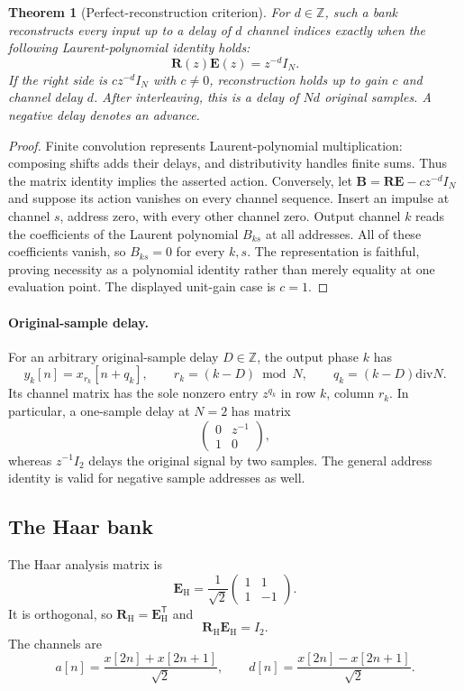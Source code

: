 \documentclass[11pt,a4paper]{article}
\newtheorem{theorem}{Theorem}[section]
\theoremstyle{definition}
\theoremstyle{remark}
\newcommand{\bbZ}{\mathbb Z}
\begin{document}
\begin{theorem}[Perfect-reconstruction criterion]\label{result:06}
For $d\in\bbZ$, such a bank reconstructs every input up to a delay of $d$ \emph{channel indices} exactly when the following Laurent-polynomial identity holds:
\[
\boxed{
\bm R(z)\bm E(z)=z^{-d}I_N.
}
\]
If the right side is $c z^{-d}I_N$ with $c\ne0$, reconstruction holds up to gain $c$ and channel delay $d$. After interleaving, this is a delay of $Nd$ original samples. A negative delay denotes an advance.
\end{theorem}

\begin{proof}
Finite convolution represents Laurent-polynomial multiplication: composing shifts adds their delays, and distributivity handles finite sums. Thus the matrix identity implies the asserted action. Conversely, let $\bm B=\bm R\bm E-cz^{-d}I_N$ and suppose its action vanishes on every channel sequence. Insert an impulse at channel $s$, address zero, with every other channel zero. Output channel $k$ reads the coefficients of the Laurent polynomial $B_{ks}$ at all addresses. All of these coefficients vanish, so $B_{ks}=0$ for every $k,s$. The representation is faithful, proving necessity as a polynomial identity rather than merely equality at one evaluation point. The displayed unit-gain case is $c=1$.
\end{proof}

\paragraph{Original-sample delay.}
For an arbitrary original-sample delay $D\in\bbZ$, the output phase $k$ has
\[
y_k[n]=x_{r_k}[n+q_k],\qquad
r_k=(k-D)\bmod N,\qquad q_k=(k-D)\mathbin{\mathrm{div}}N.
\]
Its channel matrix has the sole nonzero entry $z^{q_k}$ in row $k$, column $r_k$. In particular, a one-sample delay at $N=2$ has matrix
\[
\begin{pmatrix}0&z^{-1}\\1&0\end{pmatrix},
\]
whereas $z^{-1}I_2$ delays the original signal by two samples. The general address identity is valid for negative sample addresses as well.

\subsection{The Haar bank}

The Haar analysis matrix is
\[
\bm E_{\mathrm{H}}
=
\frac1{\sqrt2}
\begin{pmatrix}
1&1\\
1&-1
\end{pmatrix}.
\]
It is orthogonal, so $\bm R_{\mathrm{H}}=\bm E_{\mathrm{H}}^{\mathsf T}$ and
\[
\bm R_{\mathrm{H}}\bm E_{\mathrm{H}}=I_2.
\]
The channels are
\[
a[n]=\frac{x[2n]+x[2n+1]}{\sqrt2},
\qquad
d[n]=\frac{x[2n]-x[2n+1]}{\sqrt2}.
\]
\end{document}
